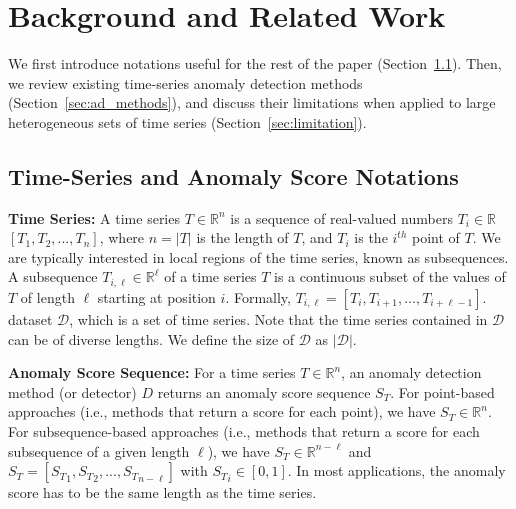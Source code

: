 \section{Background and Related Work}
\label{sec:background}

We first introduce  notations useful for the rest of the paper (Section~\ref{sec:notation}). Then, we review  existing time-series anomaly detection methods (Section~\ref{sec:ad_methods}), and discuss their limitations when applied to large heterogeneous sets of time series (Section~\ref{sec:limitation}). 

\subsection{Time-Series and Anomaly Score Notations}
\label{sec:notation}


\textbf{Time Series: }A time series $T \in \mathbb{R}^n $ is a sequence of real-valued numbers $T_i\in\mathbb{R}$ $[T_1,T_2,...,T_n]$, where $n=|T|$ is the length of $T$, and $T_i$ is the $i^{th}$ point of $T$. We are typically interested in local regions of the time series, known as subsequences. A subsequence $T_{i,\ell} \in \mathbb{R}^\ell$ of a time series $T$ is a continuous subset of the values of $T$ of length $\ell$ starting at position $i$. Formally, $T_{i,\ell} = [T_i, T_{i+1},...,T_{i+\ell-1}]$.  dataset $\mathcal{D}$, which is a set of time series. Note that the time series contained in $\mathcal{D}$ can be of diverse lengths. We define the size of $\mathcal{D}$ as $|\mathcal{D}|$.

\textbf{Anomaly Score Sequence: }For a time series $T \in \mathbb{R}^n $, an anomaly detection method (or detector) $D$ returns an anomaly score sequence $S_T$. For point-based approaches (i.e., methods that return a score for each point), we have $S_T \in \mathbb{R}^n$. For subsequence-based approaches (i.e., methods that return a score for each subsequence of a given length $\ell$), we have $S_T \in \mathbb{R}^{n-\ell}$ and $S_T = [{S_T}_1,{S_T}_2,...,{S_T}_{n-\ell}]$ with ${S_T}_i \in [0,1]$. In most applications, the anomaly score has to be the same length as the time series. 

